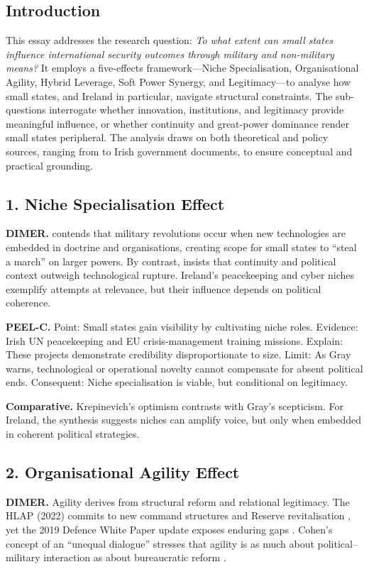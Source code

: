 \subsection*{Introduction}
This essay addresses the research question: \textit{To what extent can small states influence international security outcomes through military and non-military means?} It employs a five-effects framework---Niche Specialisation, Organisational Agility, Hybrid Leverage, Soft Power Synergy, and Legitimacy---to analyse how small states, and Ireland in particular, navigate structural constraints. The sub-questions interrogate whether innovation, institutions, and legitimacy provide meaningful influence, or whether continuity and great-power dominance render small states peripheral. The analysis draws on both theoretical and policy sources, ranging from \textcite{KREPINEVICH_1994} to Irish government documents, to ensure conceptual and practical grounding.

\subsection*{1. Niche Specialisation Effect}
\textbf{DIMER.} \textcite{KREPINEVICH_1994} contends that military revolutions occur when new technologies are embedded in doctrine and organisations, creating scope for small states to ``steal a march'' on larger powers. By contrast, \textcite{GRAY_2005} insists that continuity and political context outweigh technological rupture. Ireland’s peacekeeping and cyber niches exemplify attempts at relevance, but their influence depends on political coherence.

\textbf{PEEL-C.} Point: Small states gain visibility by cultivating niche roles. Evidence: Irish UN peacekeeping and EU crisis-management training missions. Explain: These projects demonstrate credibility disproportionate to size. Limit: As Gray warns, technological or operational novelty cannot compensate for absent political ends. Consequent: Niche specialisation is viable, but conditional on legitimacy. 

\textbf{Comparative.} Krepinevich’s optimism contrasts with Gray’s scepticism. For Ireland, the synthesis suggests niches can amplify voice, but only when embedded in coherent political strategies.

\subsection*{2. Organisational Agility Effect}
\textbf{DIMER.} Agility derives from structural reform and relational legitimacy. The HLAP (2022) commits to new command structures and Reserve revitalisation \parencite{HLAP_2022}, yet the 2019 Defence White Paper update exposes enduring gaps \parencite{WHITE_2019}. Cohen’s concept of an ``unequal dialogue'' stresses that agility is as much about political–military interaction as about bureaucratic reform \parencite{COHEN_2002}. 

